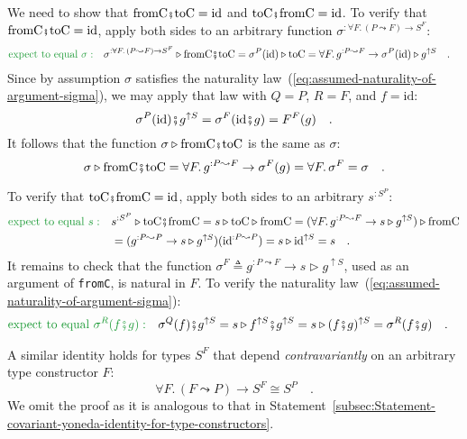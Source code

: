 We need to show that $\text{fromC}\bef\text{toC}=\text{id}$ and $\text{toC}\bef\text{fromC}=\text{id}$.
To verify that $\text{fromC}\bef\text{toC}=\text{id}$, apply both
sides to an arbitrary function $\sigma^{:\forall F.\,(P\leadsto F)\rightarrow S^{F}}$:
\begin{align*}
{\color{greenunder}\text{expect to equal }\sigma:}\quad & \sigma^{:\forall F.\,(P\leadsto F)\rightarrow S^{F}}\triangleright\text{fromC}\bef\text{toC}=\sigma^{P}(\text{id})\triangleright\text{toC}=\forall F.\,g^{:P\leadsto F}\rightarrow\sigma^{P}(\text{id})\triangleright g^{\uparrow S}\quad.
\end{align*}
Since by assumption $\sigma$ satisfies the naturality law~(\ref{eq:assumed-naturality-of-argument-sigma}),
we may apply that law with $Q=P$, $R=F$, and $f=\text{id}$:
\[
\sigma^{P}(\text{id})\bef g^{\uparrow S}=\sigma^{F}(\text{id}\bef g)=F^{F}(g)\quad.
\]
It follows that the function $\sigma\triangleright\text{fromC}\bef\text{toC}$
is the same as $\sigma$:
\[
\sigma\triangleright\text{fromC}\bef\text{toC}=\forall F.\,g^{:P\leadsto F}\rightarrow\sigma^{F}(g)=\forall F.\,\sigma^{F}=\sigma\quad.
\]

To verify that $\text{toC}\bef\text{fromC}=\text{id}$, apply both
sides to an arbitrary $s^{:S^{P}}$:
\begin{align*}
{\color{greenunder}\text{expect to equal }s:}\quad & s^{:S^{P}}\triangleright\text{toC}\bef\text{fromC}=s\triangleright\text{toC}\triangleright\text{fromC}=(\forall F.\,g^{:P\leadsto F}\rightarrow s\triangleright g^{\uparrow S})\triangleright\text{fromC}\\
 & =(g^{:P\leadsto P}\rightarrow s\triangleright g^{\uparrow S})(\text{id}^{:P\leadsto P})=s\triangleright\text{id}^{\uparrow S}=s\quad.
\end{align*}
It remains to check that the function $\sigma^{F}\triangleq g^{:P\leadsto F}\rightarrow s\triangleright g^{\uparrow S}$,
used as an argument of \lstinline!fromC!, is natural in $F$. To
verify the naturality law~(\ref{eq:assumed-naturality-of-argument-sigma}):
\begin{align*}
{\color{greenunder}\text{expect to equal }\sigma^{R}(f\bef g):}\quad & \sigma^{Q}(f)\bef g^{\uparrow S}=s\triangleright f^{\uparrow S}\bef g^{\uparrow S}=s\triangleright(f\bef g)^{\uparrow S}=\sigma^{R}(f\bef g)\quad.
\end{align*}

A similar identity holds for types $S^{F}$ that depend \emph{contravariantly}
on an arbitrary type constructor $F$:
\begin{equation}
\forall F.\,(F\leadsto P)\rightarrow S^{F}\cong S^{P}\quad.\label{eq:contravariant-yoneda-identity-for-type-constructors}
\end{equation}
We omit the proof as it is analogous to that in Statement~\ref{subsec:Statement-covariant-yoneda-identity-for-type-constructors}.

